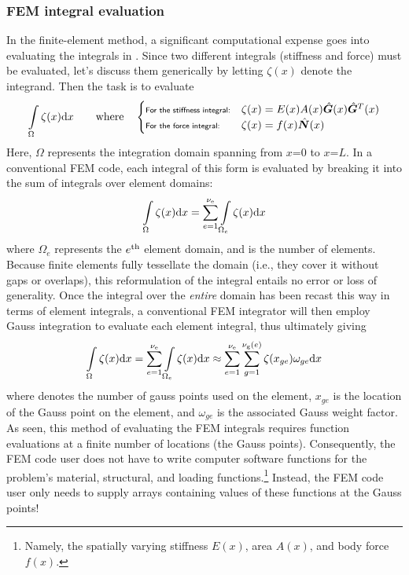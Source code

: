 \subsubsection{FEM integral evaluation}
In the finite-element method, a significant computational expense goes into evaluating the integrals in .  Since two different integrals (stiffness and force) must be evaluated, let's discuss them generically by letting $\zeta(x)$ denote the integrand. Then the task is to evaluate 
\begin{equation}
  \int\limits_\Omega \zeta(x) \mathrm{d} x
\qquad\text{where}\quad
\begin{cases}
\text{\scriptsize{\textsf{For the stiffness integral:}}}& \zeta(x)=E(x)A(x)\hat{\bm{G}}(x)\hat{\bm{G}}^T(x)\\
\text{\scriptsize{\textsf{For the force integral:}}}& \zeta(x)=f(x)\hat{\bm{N}}(x)\\
\end{cases}
\label{eq:LinearBarGenericIntegral}
\end{equation}
Here, $\Omega$ represents the integration domain spanning from $x$=$0$ to $x$=$L$. In a conventional FEM code, each integral of this form is evaluated by breaking it into the sum of integrals over element domains:
\begin{equation}
  \int\limits_\Omega \zeta(x) \mathrm{d} x = \sum\limits_{e=1}^{{\nu_\text{e}}}\int\limits_{\Omega_e} \zeta(x) \mathrm{d} x
\label{eq:LinearBarGenericIntegralBrokenIntoElements}
\end{equation}
where $\Omega_e$ represents the $e^\text{th}$ element domain, and \numelements is the number of elements. Because finite elements fully tessellate the domain (i.e., they cover it without gaps or overlaps), this reformulation of the integral entails no error or loss of generality.  Once the integral over the \emph{entire} domain has been recast this way in terms of element integrals, a conventional FEM integrator will then employ Gauss integration to evaluate each element integral, thus ultimately giving
\begin{equation}
  \int\limits_\Omega \zeta(x) \mathrm{d} x = \sum\limits_{e=1}^{{\nu_\text{e}}}\int\limits_{\Omega_e} \zeta(x) \mathrm{d} x \approx \sum\limits_{e=1}^{{\nu_\text{e}}}\sum\limits_{g=1}^{{\nu_\text{g}(e)}} \zeta(x_{ge}) \omega_{ge} \mathrm{d} x
\label{eq:oneDFEMstyleIntegration}
\end{equation}
where \numgaussOnElemente denotes the number of gauss points used on the \eeth element, $x_{ge}$ is the location of the \gth Gauss point on the \eeth element, and $\omega_{ge}$ is the associated Gauss weight factor.  As seen, this method of evaluating the FEM integrals requires function evaluations at a finite number of locations (the Gauss points). Consequently, the FEM code user does not have to write computer software functions for the problem's material, structural, and loading functions.\footnote{Namely, the spatially varying stiffness $E(x)$, area $A(x)$, and body force $f(x)$.} Instead, the FEM code user only needs to supply arrays containing values of these functions at the Gauss points!  

